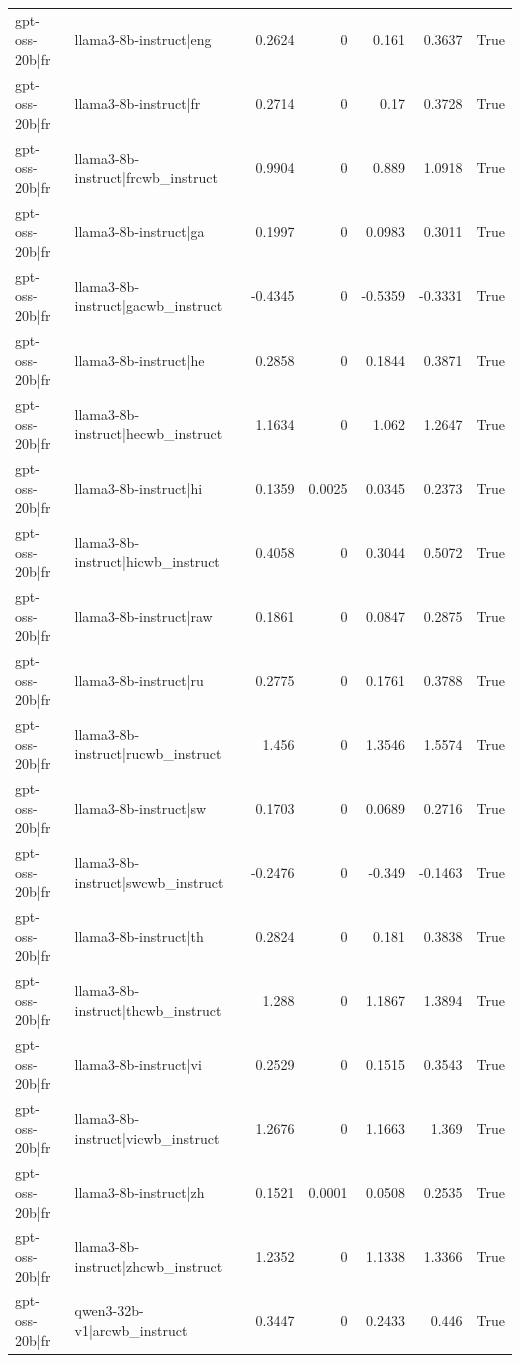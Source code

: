 \begin{table}
\begin{tabular}{l l r r r r l}
gpt-oss-20b|fr & llama3-8b-instruct|eng & 0.2624 & 0 & 0.161 & 0.3637 & True \\
gpt-oss-20b|fr & llama3-8b-instruct|fr & 0.2714 & 0 & 0.17 & 0.3728 & True \\
gpt-oss-20b|fr & llama3-8b-instruct|frcwb_instruct & 0.9904 & 0 & 0.889 & 1.0918 & True \\
gpt-oss-20b|fr & llama3-8b-instruct|ga & 0.1997 & 0 & 0.0983 & 0.3011 & True \\
gpt-oss-20b|fr & llama3-8b-instruct|gacwb_instruct & -0.4345 & 0 & -0.5359 & -0.3331 & True \\
gpt-oss-20b|fr & llama3-8b-instruct|he & 0.2858 & 0 & 0.1844 & 0.3871 & True \\
gpt-oss-20b|fr & llama3-8b-instruct|hecwb_instruct & 1.1634 & 0 & 1.062 & 1.2647 & True \\
gpt-oss-20b|fr & llama3-8b-instruct|hi & 0.1359 & 0.0025 & 0.0345 & 0.2373 & True \\
gpt-oss-20b|fr & llama3-8b-instruct|hicwb_instruct & 0.4058 & 0 & 0.3044 & 0.5072 & True \\
gpt-oss-20b|fr & llama3-8b-instruct|raw & 0.1861 & 0 & 0.0847 & 0.2875 & True \\
gpt-oss-20b|fr & llama3-8b-instruct|ru & 0.2775 & 0 & 0.1761 & 0.3788 & True \\
gpt-oss-20b|fr & llama3-8b-instruct|rucwb_instruct & 1.456 & 0 & 1.3546 & 1.5574 & True \\
gpt-oss-20b|fr & llama3-8b-instruct|sw & 0.1703 & 0 & 0.0689 & 0.2716 & True \\
gpt-oss-20b|fr & llama3-8b-instruct|swcwb_instruct & -0.2476 & 0 & -0.349 & -0.1463 & True \\
gpt-oss-20b|fr & llama3-8b-instruct|th & 0.2824 & 0 & 0.181 & 0.3838 & True \\
gpt-oss-20b|fr & llama3-8b-instruct|thcwb_instruct & 1.288 & 0 & 1.1867 & 1.3894 & True \\
gpt-oss-20b|fr & llama3-8b-instruct|vi & 0.2529 & 0 & 0.1515 & 0.3543 & True \\
gpt-oss-20b|fr & llama3-8b-instruct|vicwb_instruct & 1.2676 & 0 & 1.1663 & 1.369 & True \\
gpt-oss-20b|fr & llama3-8b-instruct|zh & 0.1521 & 0.0001 & 0.0508 & 0.2535 & True \\
gpt-oss-20b|fr & llama3-8b-instruct|zhcwb_instruct & 1.2352 & 0 & 1.1338 & 1.3366 & True \\
gpt-oss-20b|fr & qwen3-32b-v1|arcwb_instruct & 0.3447 & 0 & 0.2433 & 0.446 & True \\

\end{tabular}
\end{table}
